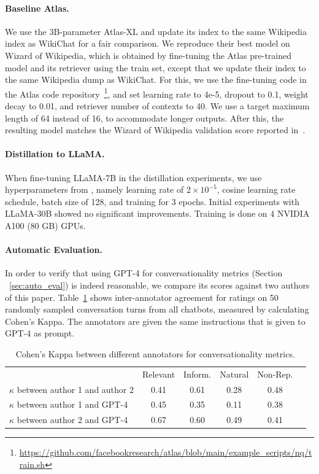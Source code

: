 \documentclass[11pt]{article}
\newcommand{\system}[0]{WikiChat\xspace}
\begin{document}
\paragraph{Baseline Atlas.}
We use the 3B-parameter Atlas-XL and update its index to the same Wikipedia index as \system for a fair comparison.
We reproduce their best model on Wizard of Wikipedia, which is obtained by fine-tuning the Atlas pre-trained model and its retriever using the train set, except that we update their index to the same Wikipedia dump as \system. For this, we use the fine-tuning code in the Atlas code repository~\footnote{\url{https://github.com/facebookresearch/atlas/blob/main/example_scripts/nq/train.sh}}, and set learning rate to 4e-5, dropout to 0.1, weight decay to 0.01, and retriever number of contexts to 40. We use a target maximum length of 64 instead of 16, to accommodate longer outputs.
After this, the resulting model matches the Wizard of Wikipedia validation score reported in~\citet{izacard2022atlas}.

\paragraph{Distillation to LLaMA.}
When fine-tuning LLaMA-7B in the distillation experiments, we use hyperparameters from \cite{alpaca}, namely learning rate of $2\times 10^{-5}$, cosine learning rate schedule, batch size of 128, and training for 3 epochs.
Initial experiments with LLaMA-30B showed no significant improvements.
Training is done on 4 NVIDIA A100 (80 GB) GPUs.


\paragraph{Automatic Evaluation.}
\label{appendix:automatic_eval}
In order to verify that using GPT-4 for conversationality metrics (Section ~\ref{sec:auto_eval}) is indeed reasonable, we compare its scores against two authors of this paper. Table~\ref{table:kappa} shows inter-annotator agreement for ratings on 50 randomly sampled conversation turns from all chatbots, measured by calculating Cohen's Kappa. The annotators are given the same instructions that is given to GPT-4 as prompt.

\begin{table}[ht]
\centering
\begin{tabular}{lccccc} 
 \hline
& Relevant & Inform. & Natural & Non-Rep. \\
 $\kappa$ between author 1 and author 2 & 0.41 & 0.61 & 0.28 & 0.48 \\
 $\kappa$ between author 1 and GPT-4 & 0.45 & 0.35 & 0.11 & 0.38 \\
 $\kappa$ between author 2 and GPT-4 & 0.67 & 0.60 & 0.49 & 0.41 \\
 \hline

\end{tabular}
\caption{Cohen's Kappa between different annotators for conversationality metrics.}
\label{table:kappa}
\end{table}
\end{document}
